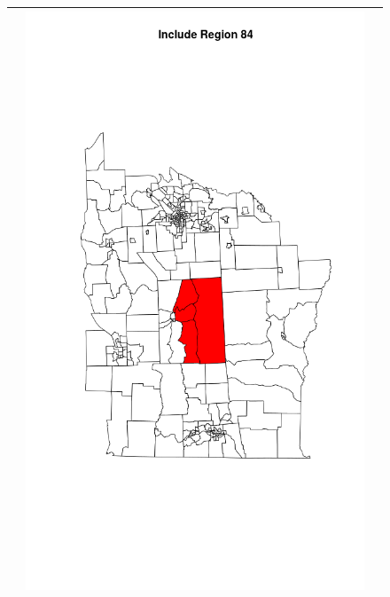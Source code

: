 \documentclass[12pt]{article}
\begin{document}
\begin{figure}[!ht]
\begin{tabular}{|c|c|c|}
							   & \includegraphics[scale=0.18]{ny84.png} \\ \hline

\end{tabular}
\end{figure}
\end{document}
